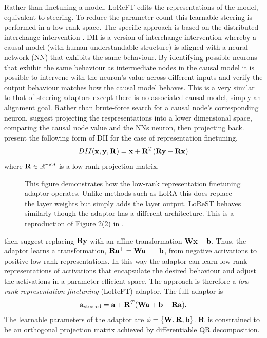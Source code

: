 Rather than finetuning a model, LoReFT edits the representations of the model, equivalent to steering.
To reduce the parameter count this learnable steering is performed in a low-rank space.
The specific approach is based on the distributed interchange intervention \citep[DII]{dii}.
DII is a version of interchange intervention whereby a causal model (with human understandable structure) is aligned with a neural network (NN) that exhibits the same behaviour.
By identifying possible neurons that exhibit the same behaviour as intermediate nodes in the causal model it is possible to intervene with the neuron's value across different inputs and verify the output behaviour matches how the causal model behaves.
This is a very similar to that of steering adaptors except there is no associated causal model, simply an alignment goal.
Rather than brute-force search for a causal node's corresponding neuron, \citet{dii} suggest projecting the respresentations into a lower dimensional space, comparing the causal node value and the NNs neuron, then projecting back.
\citet{reft} present the following form of DII for the case of representation finetuning.
\begin{equation*}
    DII(\mathbf{x},\mathbf{y},\mathbf{R}) = \mathbf{x} + \mathbf{R}^T(\mathbf{R}\mathbf{y} - \mathbf{R}\mathbf{x})
\end{equation*}
where $\mathbf{R} \in \mathbb{R}^{r\times d}$ is a low-rank projection matrix.

\begin{figure}
    \centering
    \captionsetup{width=.9\textwidth}
    
    \caption{This figure demonstrates how the low-rank representation finetuning adaptor \citep{reft} operates. Unlike methods such as LoRA \citep{lora} this does replace the layer weights but simply adds the layer output. LoReST \citep{steering-clear} behaves similarly though the adaptor has a different architecture. This is a reproduction of Figure 2(2) in \citet{reft}.}
     \label{fig:loreft}
\end{figure}

\citet{reft} then suggest replacing $\mathbf{R}\mathbf{y}$ with an affine transformation $\mathbf{W}\mathbf{x} + \mathbf{b}$.
Thus, the adaptor learns a transformation, $\mathbf{R}\mathbf{a}^+ = \mathbf{W}\mathbf{a}^- + \mathbf{b}$, from negative activations to positive low-rank representations.
In this way the adaptor can learn low-rank representations of activations that encapsulate the desired behaviour and adjust the activations in a parameter efficient space.
The approach is therefore a \emph{low-rank representation finetuning} (LoReFT) adaptor.
The full adaptor is
\begin{equation}
    \label{eq:loreft}
    \mathbf{a}_\text{steered} = \mathbf{a} + \mathbf{R}^T(\mathbf{W}\mathbf{a} + \mathbf{b} - \mathbf{R}\mathbf{a}).
\end{equation}
The learnable parameters of the adaptor are $\phi = \{\mathbf{W}, \mathbf{R}, \mathbf{b}\}$.
$\mathbf{R}$ is constrained to be an orthogonal projection matrix achieved by differentiable QR decomposition.

